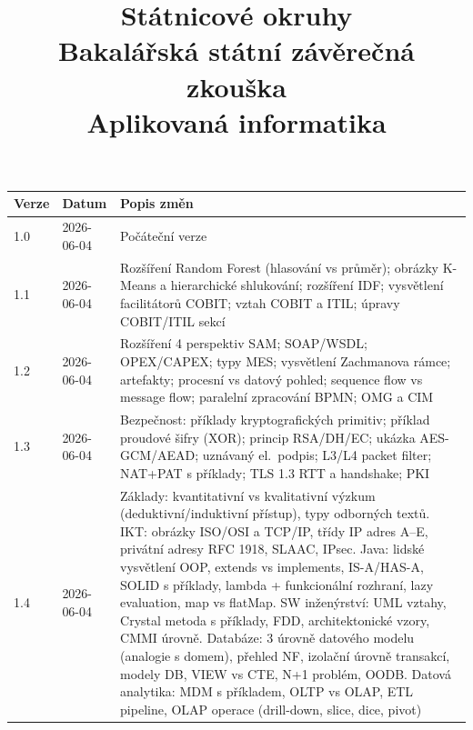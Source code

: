\documentclass[12pt,a4paper]{article}
\title{\textbf{Státnicové okruhy}\\
\large Bakalářská státní závěrečná zkouška\\
\large Aplikovaná informatika}
\author{}
\date{}
\begin{document}
\maketitle

\begin{center}
\begin{tabular}{|l|l|p{9cm}|}
\hline
\textbf{Verze} & \textbf{Datum} & \textbf{Popis změn} \\
\hline
1.0 & 2026-06-04 & Počáteční verze \\
\hline
1.1 & 2026-06-04 & Rozšíření Random Forest (hlasování vs průměr); obrázky K-Means a hierarchické shlukování; rozšíření IDF; vysvětlení facilitátorů COBIT; vztah COBIT a ITIL; úpravy COBIT/ITIL sekcí \\
\hline
1.2 & 2026-06-04 & Rozšíření 4 perspektiv SAM; SOAP/WSDL; OPEX/CAPEX; typy MES; vysvětlení Zachmanova rámce; artefakty; procesní vs datový pohled; sequence flow vs message flow; paralelní zpracování BPMN; OMG a CIM \\
\hline
1.3 & 2026-06-04 & Bezpečnost: příklady kryptografických primitiv; příklad proudové šifry (XOR); princip RSA/DH/EC; ukázka AES-GCM/AEAD; uznávaný el.\ podpis; L3/L4 packet filter; NAT+PAT s příklady; TLS 1.3 RTT a handshake; PKI \\
\hline
1.4 & 2026-06-04 & Základy: kvantitativní vs kvalitativní výzkum (deduktivní/induktivní přístup), typy odborných textů. IKT: obrázky ISO/OSI a TCP/IP, třídy IP adres A--E, privátní adresy RFC 1918, SLAAC, IPsec. Java: lidské vysvětlení OOP, extends vs implements, IS-A/HAS-A, SOLID s příklady, lambda + funkcionální rozhraní, lazy evaluation, map vs flatMap. SW inženýrství: UML vztahy, Crystal metoda s příklady, FDD, architektonické vzory, CMMI úrovně. Databáze: 3 úrovně datového modelu (analogie s domem), přehled NF, izolační úrovně transakcí, modely DB, VIEW vs CTE, N+1 problém, OODB. Datová analytika: MDM s příkladem, OLTP vs OLAP, ETL pipeline, OLAP operace (drill-down, slice, dice, pivot) \\
\hline
\end{tabular}
\end{center}

\newpage
\tableofcontents
\newpage


\newpage


\newpage


\newpage


\newpage


\newpage


\newpage


\newpage


\newpage


\newpage


\newpage


\end{document}
